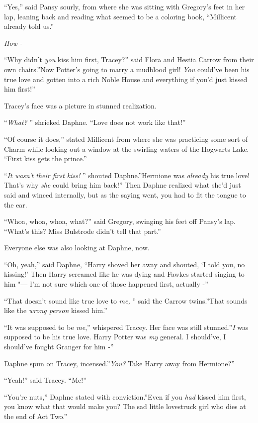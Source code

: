 ``Yes,'' said Pansy sourly, from where she was sitting with Gregory's
feet in her lap, leaning back and reading what seemed to be a coloring
book, ``Millicent already told us.''

\emph{How -}

``Why didn't \emph{you} kiss him first, Tracey?'' said Flora and Hestia
Carrow from their own chairs.''Now Potter's going to marry a mudblood
girl! \emph{You} could've been his true love and gotten into a rich
Noble House and everything if you'd just kissed him first!''

Tracey's face was a picture in stunned realization.

``\emph{What?} '' shrieked Daphne. ``Love does not work like that!''

``Of course it does,'' stated Millicent from where she was practicing
some sort of Charm while looking out a window at the swirling waters of
the Hogwarts Lake. ``First kiss gets the prince.''

``\emph{It wasn't their first kiss!} '' shouted Daphne.''Hermione was
\emph{already} his true love! That's why \emph{she} could bring him
back!'' Then Daphne realized what she'd just said and winced internally,
but as the saying went, you had to fit the tongue to the ear.

``Whoa, whoa, whoa, what?'' said Gregory, swinging his feet off Pansy's
lap. ``What's this? Miss Bulstrode didn't tell that part.''

Everyone else was also looking at Daphne, now.

``Oh, yeah,'' said Daphne, ``Harry shoved her away and shouted, `I told
you, no kissing!' Then Harry screamed like he was dying and Fawkes
started singing to him "--- I'm not sure which one of those happened first,
actually -''

``That doesn't sound like true love to \emph{me,} '' said the Carrow
twins.''That sounds like the \emph{wrong person} kissed him.''

``It was supposed to be \emph{me},'' whispered Tracey. Her face was still
stunned.''\emph{I} was supposed to be his true love. Harry Potter was
\emph{my} general. I should've, I should've fought Granger for him -''

Daphne spun on Tracey, incensed.''\emph{You?} Take Harry away from
Hermione?''

``Yeah!'' said Tracey. ``Me!''

``You're nuts,'' Daphne stated with conviction.''Even if you \emph{had}
kissed him first, you know what that would make you? The sad little
lovestruck girl who dies at the end of Act Two.''


